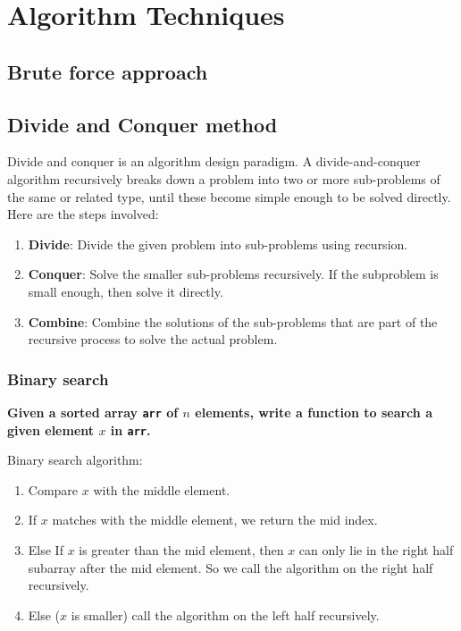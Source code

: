 \documentclass[a4paper,11pt]{book}
\begin{document}
\newpage
\chapter{Algorithm Techniques}

\section{Brute force approach}

\section{Divide and Conquer method}

\noindent Divide and conquer is an algorithm design paradigm. A divide-and-conquer algorithm recursively breaks down a problem into two or more sub-problems of the same or related type, until these become simple enough to be solved directly. Here are the steps involved:
\begin{enumerate}
    \item \textbf{Divide}: Divide the given problem into sub-problems using recursion.
    \item \textbf{Conquer}: Solve the smaller sub-problems recursively. If the subproblem is small enough, then solve it directly.
    \item \textbf{Combine}: Combine the solutions of the sub-problems that are part of the recursive process to solve the actual problem.
\end{enumerate}
\subsection{Binary search}

\textbf{Given a sorted array \lstinline{arr} of $n$ elements, write a function to search a given element $x$ in \lstinline{arr}.}
\vspace{4mm}

\noindent Binary search algorithm:
\begin{enumerate}
    \item Compare $x$ with the middle element.
    \item If $x$ matches with the middle element, we return the mid index.
    \item Else If $x$ is greater than the mid element, then $x$ can only lie in the right half subarray after the mid element. So we call the algorithm on the right half recursively.
    \item Else ($x$ is smaller) call the algorithm on the left half recursively.
\end{enumerate}
\vspace{5mm}
\end{document}
